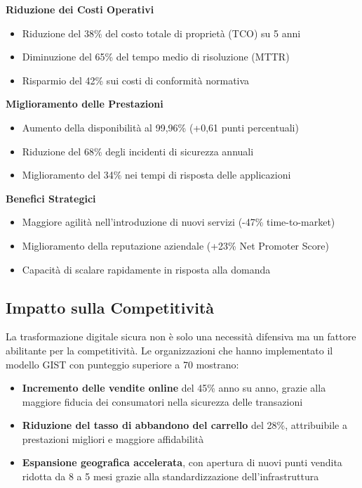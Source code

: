 \begin{tcolorbox}[
    colback=yellow!5!white,
    colframe=orange!75!black,
    title={\textbf{Benefici Quantificati - Sintesi Esecutiva}},
    fonttitle=\bfseries
]

\textbf{Riduzione dei Costi Operativi}
\begin{itemize}
    \item Riduzione del 38\% del costo totale di proprietà (TCO) su 5 anni
    \item Diminuzione del 65\% del tempo medio di risoluzione (MTTR)
    \item Risparmio del 42\% sui costi di conformità normativa
\end{itemize}

\textbf{Miglioramento delle Prestazioni}
\begin{itemize}
    \item Aumento della disponibilità al 99,96\% (+0,61 punti percentuali)
    \item Riduzione del 68\% degli incidenti di sicurezza annuali
    \item Miglioramento del 34\% nei tempi di risposta delle applicazioni
\end{itemize}

\textbf{Benefici Strategici}
\begin{itemize}
    \item Maggiore agilità nell'introduzione di nuovi servizi (-47\% time-to-market)
    \item Miglioramento della reputazione aziendale (+23\% Net Promoter Score)
    \item Capacità di scalare rapidamente in risposta alla domanda
\end{itemize}

\end{tcolorbox}

\subsection{Impatto sulla Competitività}
\label{subsec:5.5.2}

La trasformazione digitale sicura non è solo una necessità difensiva ma un fattore abilitante per la competitività. Le organizzazioni che hanno implementato il modello GIST con punteggio superiore a 70 mostrano:

\begin{itemize}
\item \textbf{Incremento delle vendite online} del 45\% anno su anno, grazie alla maggiore fiducia dei consumatori nella sicurezza delle transazioni
\item \textbf{Riduzione del tasso di abbandono del carrello} del 28\%, attribuibile a prestazioni migliori e maggiore affidabilità
\item \textbf{Espansione geografica accelerata}, con apertura di nuovi punti vendita ridotta da 8 a 5 mesi grazie alla standardizzazione dell'infrastruttura
\end{itemize}

